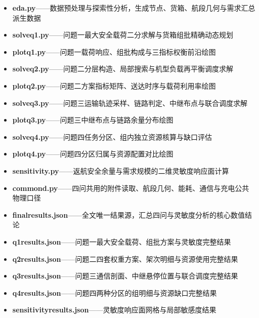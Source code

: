 \documentclass[bwprint]{gmcmthesis}
\begin{document}
\begin{appendices}
\begin{itemize}[label={},leftmargin=1.9em,itemsep=0.25em,topsep=0.25em]
    \item \textbf{eda.py}——数据预处理与探索性分析，生成节点、货箱、航段几何与需求汇总派生数据
    \item \textbf{solve\textunderscore{}q1.py}——问题一最大安全载荷二分求解与货箱组批精确动态规划
    \item \textbf{plot\textunderscore{}q1.py}——问题一载荷响应、组批构成与三指标权衡前沿绘图
    \item \textbf{solve\textunderscore{}q2.py}——问题二分层构造、局部搜索与机型负载再平衡调度求解
    \item \textbf{plot\textunderscore{}q2.py}——问题二方案指标矩阵、送达时序与载荷利用率绘图
    \item \textbf{solve\textunderscore{}q3.py}——问题三运输轨迹采样、链路判定、中继布点与联合调度求解
    \item \textbf{plot\textunderscore{}q3.py}——问题三中继布点与链路余量分布绘图
    \item \textbf{solve\textunderscore{}q4.py}——问题四任务分区、组内独立资源核算与缺口评估
    \item \textbf{plot\textunderscore{}q4.py}——问题四分区归属与资源配置对比绘图
    \item \textbf{sensitivity.py}——返航安全余量与需求规模的二维灵敏度响应面计算
    \item \textbf{common\textunderscore{}d.py}——四问共用的附件读取、航段几何、能耗、通信与充电公共物理口径
    \item \textbf{final\textunderscore{}results.json}——全文唯一结果源，汇总四问与灵敏度分析的核心数值结论
    \item \textbf{q1\textunderscore{}results.json}——问题一最大安全载荷、组批方案与灵敏度完整结果
    \item \textbf{q2\textunderscore{}results.json}——问题二四套权重方案、架次明细与资源使用完整结果
    \item \textbf{q3\textunderscore{}results.json}——问题三通信剖面、中继悬停位置与联合调度完整结果
    \item \textbf{q4\textunderscore{}results.json}——问题四两种分区的组明细与资源缺口完整结果
    \item \textbf{sensitivity\textunderscore{}results.json}——灵敏度响应面网格与局部敏感度结果
\end{itemize}


\end{appendices}
\end{document}
